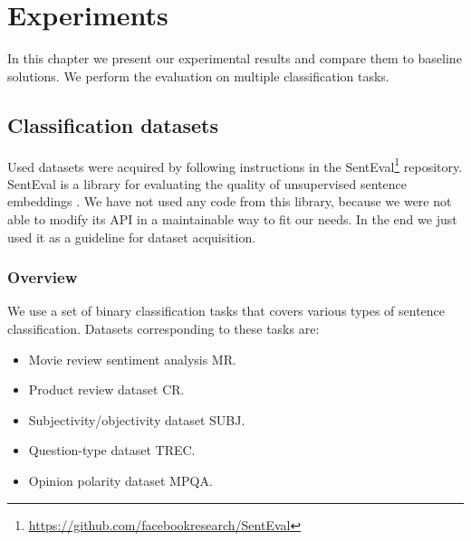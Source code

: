 \chapter{Experiments}

In this chapter we present our experimental results and compare them to baseline solutions.
We perform the evaluation on multiple classification tasks. 

\section{Classification datasets}
    
    Used datasets were acquired by following instructions in the SentEval\footnote{\url{https://github.com/facebookresearch/SentEval}} repository.
    SentEval is a library for evaluating the quality of unsupervised sentence embeddings \cite{conneau2017supervised}.
    We have not used any code from this library, because we were not able to modify its API in a maintainable way to fit our needs. 
    In the end we just used it as a guideline for dataset acquisition.
    
    \subsection{Overview} \label{sec:data:overview}
    We use a set of binary classification tasks that covers various types of sentence classification.
    Datasets corresponding to these tasks are:
    \begin{itemize}
        \item Movie review sentiment analysis MR.
        \item Product review dataset CR.
        \item Subjectivity/objectivity dataset SUBJ.
        \item Question-type dataset TREC.
        \item Opinion polarity dataset MPQA.
    \end{itemize}
    
